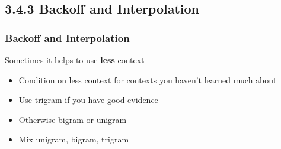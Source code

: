 \documentclass[13.5pt,aspecratio=169]{beamer}
\begin{document}
\subsection{3.4.3 Backoff and Interpolation}
\begin{frame}
    \onehalfspacing
        \frametitle{Backoff and Interpolation}
        {\Large Sometimes it helps to use \textbf{less} context}
        \begin{itemize}
            \item {Condition on less context for contexts you haven’t learned much about}
    
        \end{itemize}
        
        \begin{minipage}{0.5\textwidth}
            \begin{block}{}
                \begin{itemize}
                    \item Use trigram if you have good evidence
                    \item Otherwise bigram or unigram
                \end{itemize}
            \end{block}
        \end{minipage} \hspace{10pt}
        \begin{minipage}{0.45\textwidth}
            \begin{block}{}
                \begin{itemize}
                    \item Mix unigram, bigram, trigram \\ \vspace{5pt}
                    \hphantom{fndfjndnjfjnd}
                \end{itemize}
            \end{block}
        \end{minipage}
    
        \bigskip

       
    \end{frame}
\end{document}
